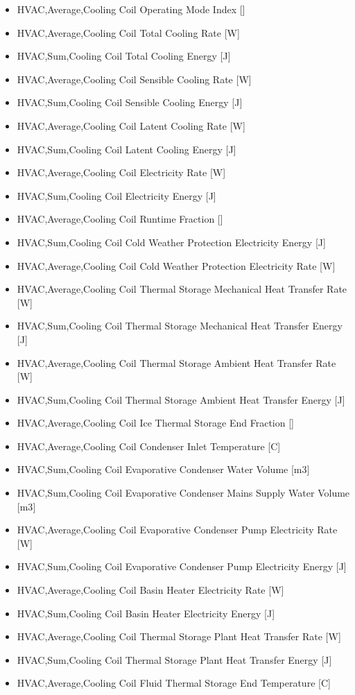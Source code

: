 \begin{itemize}
\item
  HVAC,Average,Cooling Coil Operating Mode Index {[]}
\item
  HVAC,Average,Cooling Coil Total Cooling Rate {[}W{]}
\item
  HVAC,Sum,Cooling Coil Total Cooling Energy {[}J{]}
\item
  HVAC,Average,Cooling Coil Sensible Cooling Rate {[}W{]}
\item
  HVAC,Sum,Cooling Coil Sensible Cooling Energy {[}J{]}
\item
  HVAC,Average,Cooling Coil Latent Cooling Rate {[}W{]}
\item
  HVAC,Sum,Cooling Coil Latent Cooling Energy {[}J{]}
\item
  HVAC,Average,Cooling Coil Electricity Rate {[}W{]}
\item
  HVAC,Sum,Cooling Coil Electricity Energy {[}J{]}
\item
  HVAC,Average,Cooling Coil Runtime Fraction {[]}
\item
  HVAC,Sum,Cooling Coil Cold Weather Protection Electricity Energy {[}J{]}
\item
  HVAC,Average,Cooling Coil Cold Weather Protection Electricity Rate {[}W{]}
\item
  HVAC,Average,Cooling Coil Thermal Storage Mechanical Heat Transfer Rate {[}W{]}
\item
  HVAC,Sum,Cooling Coil Thermal Storage Mechanical Heat Transfer Energy {[}J{]}
\item
  HVAC,Average,Cooling Coil Thermal Storage Ambient Heat Transfer Rate {[}W{]}
\item
  HVAC,Sum,Cooling Coil Thermal Storage Ambient Heat Transfer Energy {[}J{]}
\item
  HVAC,Average,Cooling Coil Ice Thermal Storage End Fraction {[]}
\item
  HVAC,Average,Cooling Coil Condenser Inlet Temperature {[}C{]}
\item
  HVAC,Sum,Cooling Coil Evaporative Condenser Water Volume {[}m3{]}
\item
  HVAC,Sum,Cooling Coil Evaporative Condenser Mains Supply Water Volume {[}m3{]}
\item
  HVAC,Average,Cooling Coil Evaporative Condenser Pump Electricity Rate {[}W{]}
\item
  HVAC,Sum,Cooling Coil Evaporative Condenser Pump Electricity Energy {[}J{]}
\item
  HVAC,Average,Cooling Coil Basin Heater Electricity Rate {[}W{]}
\item
  HVAC,Sum,Cooling Coil Basin Heater Electricity Energy {[}J{]}
\item
  HVAC,Average,Cooling Coil Thermal Storage Plant Heat Transfer Rate {[}W{]}
\item
  HVAC,Sum,Cooling Coil Thermal Storage Plant Heat Transfer Energy {[}J{]}
\item
  HVAC,Average,Cooling Coil Fluid Thermal Storage End Temperature {[}C{]}
\end{itemize}

